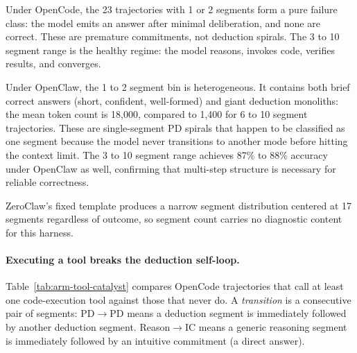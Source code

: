 
Under OpenCode, the 23 trajectories with 1 or 2 segments form a pure failure
class: the model emits an answer after minimal deliberation, and none are
correct.
These are premature commitments, not deduction spirals.
The 3 to 10 segment range is the healthy regime: the model reasons, invokes
code, verifies results, and converges.

Under OpenClaw, the 1 to 2 segment bin is heterogeneous.
It contains both brief correct answers (short, confident, well-formed) and
giant deduction monoliths: the mean token count is 18,000, compared to 1,400
for 6 to 10 segment trajectories.
These are single-segment PD spirals that happen to be classified as one
segment because the model never transitions to another mode before hitting
the context limit.
The 3 to 10 segment range achieves 87\% to 88\% accuracy under OpenClaw as
well, confirming that multi-step structure is necessary for reliable
correctness.

ZeroClaw's fixed template produces a narrow segment distribution centered at
17 segments regardless of outcome, so segment count carries no diagnostic
content for this harness.

\paragraph{Executing a tool breaks the deduction self-loop.}

Table~\ref{tab:arm-tool-catalyst} compares OpenCode trajectories that call
at least one code-execution tool against those that never do.
A \emph{transition} is a consecutive pair of segments: PD$\to$PD means a
deduction segment is immediately followed by another deduction segment.
Reason$\to$IC means a generic reasoning segment is immediately followed by
an intuitive commitment (a direct answer).

